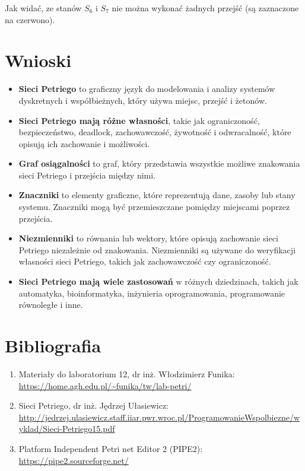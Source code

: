 \documentclass[11pt]{article}
\begin{document}
Jak widać, ze stanów \(S_6\) i \(S_7\) nie można wykonać żadnych przejść
(są zaznaczone na czerwono).

    \hypertarget{wnioski}{%
\section{Wnioski}\label{wnioski}}

\begin{itemize}
\item
  \textbf{Sieci Petriego} to graficzny język do modelowania i analizy
  systemów dyskretnych i współbieżnych, który używa miejsc, przejść i
  żetonów.
\item
  \textbf{Sieci Petriego mają różne własności}, takie jak ograniczoność,
  bezpieczeństwo, deadlock, zachowawczość, żywotność i odwracalność,
  które opisują ich zachowanie i możliwości.
\item
  \textbf{Graf osiągalności} to graf, który przedstawia wszystkie
  możliwe znakowania sieci Petriego i przejścia między nimi.
\item
  \textbf{Znaczniki} to elementy graficzne, które reprezentują dane,
  zasoby lub stany systemu. Znaczniki mogą być przemieszczane pomiędzy
  miejscami poprzez przejścia.
\item
  \textbf{Niezmienniki} to równania lub wektory, które opisują
  zachowanie sieci Petriego niezależnie od znakowania. Niezmienniki są
  używane do weryfikacji własności sieci Petriego, takich jak
  zachowawczość czy ograniczoność.
\item
  \textbf{Sieci Petriego mają wiele zastosowań} w różnych dziedzinach,
  takich jak automatyka, bioinformatyka, inżynieria oprogramowania,
  programowanie równoległe i inne.
\end{itemize}

    \hypertarget{bibliografia}{%
\section{Bibliografia}\label{bibliografia}}

\begin{enumerate}
\def\labelenumi{\arabic{enumi}.}
\item
  Materiały do laboratorium 12, dr inż. Włodzimierz Funika:\\
  \url{https://home.agh.edu.pl/~funika/tw/lab-petri/}
\item
  Sieci Petriego, dr inż. Jędrzej Ułasiewicz:\\
  \url{http://jedrzej.ulasiewicz.staff.iiar.pwr.wroc.pl/ProgramowanieWspolbiezne/wyklad/Sieci-Petriego15.pdf}
\item
  Platform Independent Petri net Editor 2 (PIPE2):\\
  \url{https://pipe2.sourceforge.net/}
\end{enumerate}


    
    
    
\end{document}
